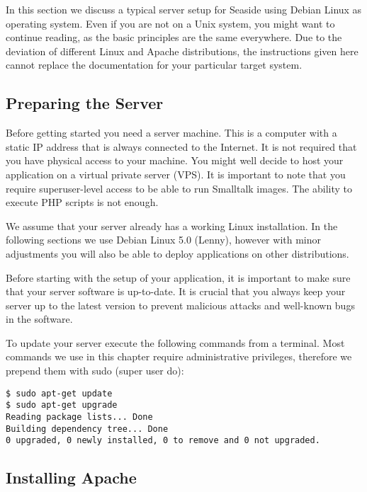 \documentclass[a4paper,10pt,twoside]{book}
\begin{document}
In this section we discuss a typical server setup for Seaside using Debian Linux as operating system. Even if you are not on a Unix system, you might want to continue reading, as the basic principles are the same everywhere. Due to the deviation of different Linux and Apache distributions, the instructions given here cannot replace the documentation for your particular target system. 

\subsection{Preparing the Server}
\label{book:advanced:deployment:deploymentapache:preparingserver}

Before getting started you need a server machine. This is a computer with a static IP address that is always connected to the Internet. It is not required that you have physical access to your machine. You might well decide to host your application on a virtual private server (VPS). It is important to note that you require superuser-level access to be able to run Smalltalk images. The ability to execute PHP scripts is not enough.

We assume that your server already has a working Linux installation. 
In the following sections we use Debian Linux 5.0 (Lenny), however with 
minor adjustments you will also be able to deploy applications on other 
distributions. 

Before starting with the setup of your application, it is important to make sure that your server software is up-to-date. It is crucial that you always keep your server up to the latest version to prevent malicious attacks and well-known bugs in the software. 

To update your server execute the following commands from a terminal. Most commands we use in this chapter require administrative privileges, therefore we prepend them with sudo (super user do):

\begin{lstlisting}
$ sudo apt-get update
$ sudo apt-get upgrade
Reading package lists... Done
Building dependency tree... Done
0 upgraded, 0 newly installed, 0 to remove and 0 not upgraded.
\end{lstlisting}

\subsection{Installing Apache}
\label{book:advanced:deployment:deploymentapache:installingapache}
\end{document}
